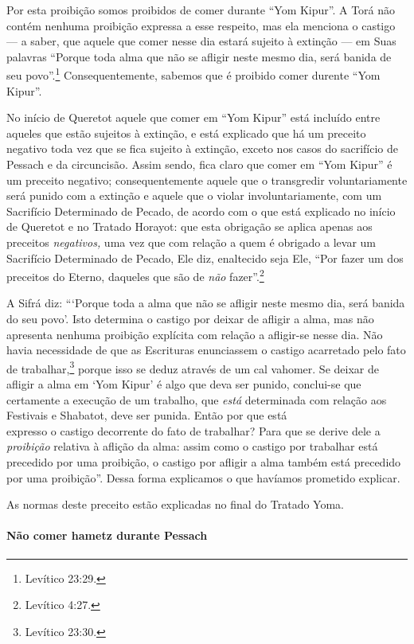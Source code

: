 Por esta proibição somos proibidos de comer durante ``Yom Kipur''. A
Torá não contém nenhuma proibição expressa a esse respeito, mas ela
menciona o castigo --- a saber, que aquele que comer nesse dia estará
sujeito à extinção --- em Suas palavras ``Porque toda alma que não se
afligir neste mesmo dia, será banida de seu povo''.\footnote{Levítico 23:29.}
Consequentemente, sabemos que é proibido comer durente ``Yom Kipur''.

No início de Queretot aquele que comer em ``Yom Kipur'' está incluído
entre aqueles que estão sujeitos à extinção, e está explicado que há
um preceito negativo toda vez que se fica sujeito à extinção, exceto nos
casos do sacrifício de Pessach e da circuncisão. Assim sendo, fica
claro que comer em ``Yom Kipur'' é um preceito negativo; consequentemente aquele que o
transgredir voluntariamente será punido com a extinção e aquele que o violar
involuntariamente, com um Sacrifício Determinado de Pecado, de acordo
com o que está explicado no início de Queretot e no Tratado Horayot: que
esta obrigação se aplica apenas aos preceitos \emph{negativos,} uma vez
que com relação a quem é obrigado a levar um Sacrifício Determinado de
Pecado, Ele diz, enaltecido seja Ele, ``Por fazer um dos preceitos do
Eterno, daqueles que são de \emph{não} fazer''.\footnote{Levítico 4:27.}

A Sifrá diz: ```Porque toda a alma que não se afligir neste mesmo dia,
será banida do seu povo'. Isto determina o castigo por deixar de afligir
a alma, mas não apresenta nenhuma proibição explícita com relação a afligir-se
nesse dia. Não havia necessidade de que as Escrituras enunciassem o castigo
acarretado pelo fato de trabalhar,\footnote{Levítico 23:30.} porque isso se
deduz através de um cal vahomer.\starr{} Se deixar de
afligir a alma em `Yom Kipur' é algo que deva ser punido, conclui-se que
certamente a execução de um trabalho, que \emph{está} determinada com
relação aos Festivais e Shabatot, deve ser punida. Então por que está\\
expresso o castigo decorrente do fato de trabalhar? Para que se derive
dele a \emph{proibição} relativa à aflição da alma: assim como o castigo por
trabalhar está precedido por uma proibição, o castigo por afligir a alma
também está precedido por uma proibição''. Dessa forma explicamos o que havíamos prometido explicar.

As normas deste preceito estão explicadas no final do Tratado Yoma.

\paragraph{Não comer hametz durante Pessach}

